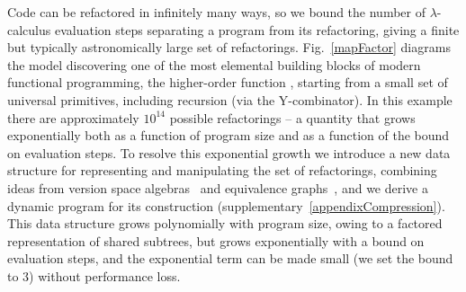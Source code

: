 \documentclass[12pt]{article}
\begin{document}
Code can be refactored in infinitely many ways,
so we bound the number of $\lambda$-calculus evaluation steps separating a program from its refactoring,
giving a finite but typically astronomically large set of refactorings.
Fig.~\ref{mapFactor} diagrams the model
discovering one of the most elemental building blocks of modern functional programming, the higher-order function
, starting from a small set of universal primitives, including recursion (via the Y-combinator).
In this example there are approximately $10^{14}$ possible refactorings -- a quantity
that grows exponentially both as a function of program size and as a
function of the bound on evaluation steps.
To resolve this exponential growth we introduce a new data structure for representing and manipulating the set of refactorings, combining ideas from version space
algebras~\cite{lau2003programming,mitchell1977version,polozov2015flashmeta}
and equivalence graphs~\cite{tate2009equality}, %
and we derive a dynamic program for its construction (supplementary~\ref{appendixCompression}).
This data structure grows polynomially with program size,
owing to a factored representation of shared subtrees,
but grows exponentially with a bound on evaluation steps,
and the exponential term can be made small (we set the bound to 3) without performance loss.
\end{document}
